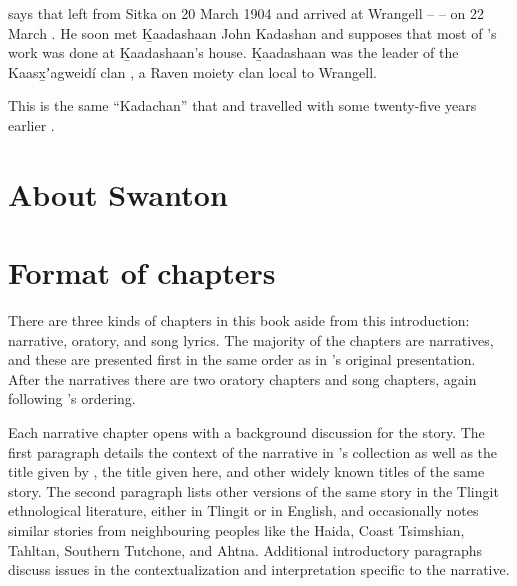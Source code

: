 \textcite{jones:2017} says that \citeauthor{swanton:1909} left from Sitka on 20 March 1904 and arrived at Wrangell –  – on 22 March \parencite[112 ff.]{jones:2017}.
He soon met Ḵaadashaan John Kadashan and \citeauthor{jones:2017} supposes that most of \citeauthor{swanton:1909}’s work was done at Ḵaadashaan’s house.
Ḵaadashaan was the leader of the Kaasx̱ʼagweidí clan \parencite[]{swanton:1908}, a Raven moiety clan local to Wrangell.

This is the same “Kadachan” that \textcite{muir:1915} and \textcite{young:1915} travelled with some twenty-five years earlier \parencite[160–165, 276 n.\ 36]{cruikshank:2005}. 

\section{About Swanton}\label{sec:intro-swanton}


\section{Format of chapters}\label{sec:intro-format}

There are three kinds of chapters in this book aside from this introduction: narrative, oratory, and song lyrics.
The majority of the chapters are narratives, and these are presented first in the same order as in \citeauthor{swanton:1909}’s original presentation.
After the narratives there are two oratory chapters and  song chapters, again following \citeauthor{swanton:1909}’s ordering.

Each narrative chapter opens with a background discussion for the story.
The first paragraph details the context of the narrative in \citeauthor{swanton:1909}’s collection as well as the title given by \citeauthor{swanton:1909}, the title given here, and other widely known titles of the same story.
The second paragraph lists other versions of the same story in the Tlingit ethnological literature, either in Tlingit or in English, and occasionally notes similar stories from neighbouring peoples like the Haida, Coast Tsimshian, Tahltan, Southern Tutchone, and Ahtna.
Additional introductory paragraphs discuss issues in the contextualization and interpretation specific to the narrative.

